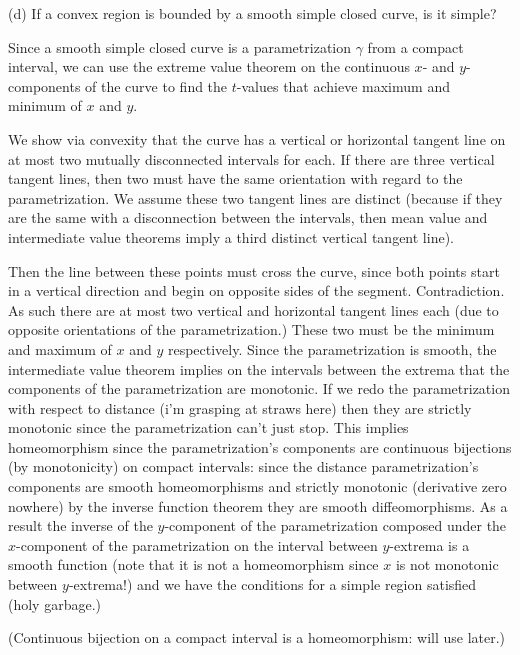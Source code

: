 \documentclass{amsart}
\begin{document}
\bigskip 

(d) If a convex region is bounded by a smooth simple closed curve, is it simple?

\medskip \noindent Since a smooth simple closed curve is a parametrization $\gamma$ from a compact interval, we can
use the extreme value theorem on the continuous $x$- and $y$-components of the curve to find the 
$t$-values that achieve maximum and minimum of $x$ and $y$. 

\medskip \noindent We show via convexity that the curve has a vertical or horizontal tangent line
on at most two mutually disconnected intervals for each. If there are three vertical tangent lines, then two must
have the same orientation with regard to the parametrization. We assume these two tangent lines
are distinct (because if they are the same with a disconnection between the intervals, then mean value and 
intermediate value theorems imply a third distinct vertical tangent line).

\medskip \noindent Then the line between these points must cross the curve, since both points start in
a vertical direction and begin on opposite sides of the segment. Contradiction. As such there are at most two
vertical and horizontal tangent lines each (due to opposite orientations of the parametrization.) These two must be
the minimum and maximum of $x$ and $y$ respectively. Since the parametrization is smooth, the intermediate value theorem
implies on the intervals between the extrema that the components of the parametrization are monotonic. If we
redo the parametrization with respect to distance (i'm grasping at straws here) then they are strictly monotonic
since the parametrization can't just stop. This implies homeomorphism since the parametrization's components are continuous bijections (by
monotonicity) on compact intervals: since the distance parametrization's components are smooth homeomorphisms and 
strictly monotonic (derivative zero nowhere) by the inverse function theorem they are smooth diffeomorphisms. As a result
the inverse of the $y$-component of the parametrization composed under the $x$-component of the parametrization on the 
interval between $y$-extrema is a smooth function (note that it is not a homeomorphism since $x$ is not monotonic between $y$-extrema!)
and we have the conditions for a simple region satisfied (holy garbage.) 


(Continuous bijection on a compact interval is a homeomorphism: will use later.)

\bigskip
\end{document}
